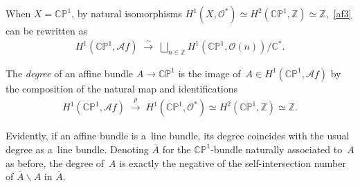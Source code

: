 When $X=\mathbb{CP}^1$, by natural isomorphisms $H^1(X,\mathscr O^*) \simeq H^2(\mathbb{CP}^1,\mathbb{Z})\simeq
\mathbb{Z}$,~\eqref{af3} can be rewritten as
\begin{gather}
\label{af4}
H^1(\mathbb{CP}^1,\mathscr Af)
\;\stackrel{\sim}{\longrightarrow}
\;
\bigsqcup_{n\in\mathbb{Z}} H^1(\mathbb{CP}^1, \mathscr O(n)) /\mathbb{C}^*.
\end{gather}

\begin{Definition}\label{def:degree}
The {\em degree} of an af\/f\/ine bundle $A\to\mathbb{CP}^1$ is the image of~$A\in H^1(\mathbb{CP}^1,\mathscr Af)$ by
the composition of the natural map and identif\/ications
\begin{gather*}
H^1(\mathbb{CP}^1,\mathscr Af)
\;\stackrel{\rho}{\longrightarrow}
\;
H^1(\mathbb{CP}^1,\mathscr O^*)\simeq
H^2(\mathbb{CP}^1,\mathbb{Z})\simeq \mathbb{Z}.
\end{gather*}
\end{Definition}

Evidently, if an af\/f\/ine bundle is a~line bundle, its degree coincides with the usual degree as a~line bundle.
Denoting $\overline A$ for the $\mathbb{CP}^1$-bundle naturally associated to~$A$ as before, the degree of~$A$ is
exactly the negative of the self-intersection number of $\overline A\backslash A$ in $\overline A$.


